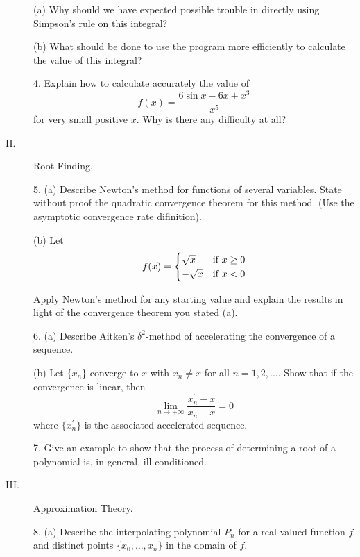 \documentclass{article}
\begin{document}
\begin{description}
\item[\qquad] (a)
Why should we have expected possible trouble in directly using Simpson's
rule on this integral?

\item[\qquad] (b)
What should be done to use the program more efficiently to calculate
the value of this integral?

\item[\quad] 4.
Explain how to calculate accurately the value of
$$f(x) = \frac{6 \sin x-6x+x^3}{x^5} $$
for very small positive $x$. Why is there any difficulty at all?

\item[II.]
Root Finding.

\item[\quad] 5. (a)
Describe Newton's method for functions of several variables. State without
proof the quadratic convergence theorem for this method. (Use the
asymptotic convergence rate difinition).

\item[\qquad] (b)
Let
$$f(x) = \begin{cases}
                \sqrt{x} & \hbox{if\ }  x\geq 0 \\
                -\sqrt{x} & \hbox{if\ }  x < 0
                \end{cases}$$

Apply Newton's method for any starting value and explain the results in
light of the convergence theorem you stated (a).

\item[\quad] 6. (a)
Describe Aitken's $\delta^2$-method of accelerating the convergence of a
sequence.

\item[\qquad] (b)
Let $\{x_n\}$ converge to $x$ with $x_n \neq x$ for all $n= 1,2, \dots$.
Show that  if the convergence is linear, then
$$\lim_{n \to +\infty} \frac{x^\prime_n - x}{x_n - x} = 0$$
where $\{x^\prime_n\}$ is the associated accelerated sequence.

\item[\quad] 7.
Give an example to show that the process of determining a root of a polynomial
is, in general, ill-conditioned.

\item[III.]
Approximation Theory.

\item[\quad] 8. (a)
Describe the interpolating polynomial $P_n$ for a real valued function $f$
and distinct points $\{x_0, \dots, x_n\}$ in the domain of $f$.


\end{description}
\end{document}
